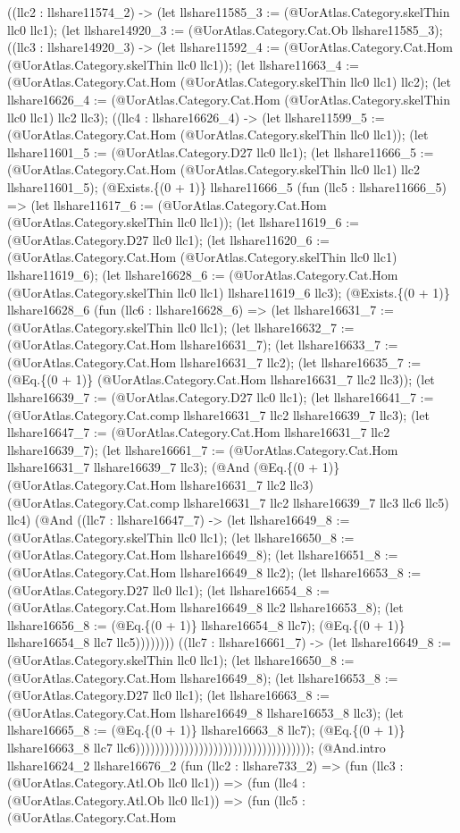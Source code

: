 \documentclass[11pt]{article}
\begin{document}
((llc2 : llshare11574\_2) -> (let llshare11585\_3 := (@UorAtlas.Category.skelThin llc0 llc1); (let llshare14920\_3 := (@UorAtlas.Category.Cat.Ob llshare11585\_3); ((llc3 : llshare14920\_3) -> (let llshare11592\_4 := (@UorAtlas.Category.Cat.Hom (@UorAtlas.Category.skelThin llc0 llc1)); (let llshare11663\_4 := (@UorAtlas.Category.Cat.Hom (@UorAtlas.Category.skelThin llc0 llc1) llc2); (let llshare16626\_4 := (@UorAtlas.Category.Cat.Hom (@UorAtlas.Category.skelThin llc0 llc1) llc2 llc3); ((llc4 : llshare16626\_4) -> (let llshare11599\_5 := (@UorAtlas.Category.Cat.Hom (@UorAtlas.Category.skelThin llc0 llc1)); (let llshare11601\_5 := (@UorAtlas.Category.D27 llc0 llc1); (let llshare11666\_5 := (@UorAtlas.Category.Cat.Hom (@UorAtlas.Category.skelThin llc0 llc1) llc2 llshare11601\_5); (@Exists.\{(0 + 1)\} llshare11666\_5 (fun (llc5 : llshare11666\_5) => (let llshare11617\_6 := (@UorAtlas.Category.Cat.Hom (@UorAtlas.Category.skelThin llc0 llc1)); (let llshare11619\_6 := (@UorAtlas.Category.D27 llc0 llc1); (let llshare11620\_6 := (@UorAtlas.Category.Cat.Hom (@UorAtlas.Category.skelThin llc0 llc1) llshare11619\_6); (let llshare16628\_6 := (@UorAtlas.Category.Cat.Hom (@UorAtlas.Category.skelThin llc0 llc1) llshare11619\_6 llc3); (@Exists.\{(0 + 1)\} llshare16628\_6 (fun (llc6 : llshare16628\_6) => (let llshare16631\_7 := (@UorAtlas.Category.skelThin llc0 llc1); (let llshare16632\_7 := (@UorAtlas.Category.Cat.Hom llshare16631\_7); (let llshare16633\_7 := (@UorAtlas.Category.Cat.Hom llshare16631\_7 llc2); (let llshare16635\_7 := (@Eq.\{(0 + 1)\} (@UorAtlas.Category.Cat.Hom llshare16631\_7 llc2 llc3)); (let llshare16639\_7 := (@UorAtlas.Category.D27 llc0 llc1); (let llshare16641\_7 := (@UorAtlas.Category.Cat.comp llshare16631\_7 llc2 llshare16639\_7 llc3); (let llshare16647\_7 := (@UorAtlas.Category.Cat.Hom llshare16631\_7 llc2 llshare16639\_7); (let llshare16661\_7 := (@UorAtlas.Category.Cat.Hom llshare16631\_7 llshare16639\_7 llc3); (@And (@Eq.\{(0 + 1)\} (@UorAtlas.Category.Cat.Hom llshare16631\_7 llc2 llc3) (@UorAtlas.Category.Cat.comp llshare16631\_7 llc2 llshare16639\_7 llc3 llc6 llc5) llc4) (@And ((llc7 : llshare16647\_7) -> (let llshare16649\_8 := (@UorAtlas.Category.skelThin llc0 llc1); (let llshare16650\_8 := (@UorAtlas.Category.Cat.Hom llshare16649\_8); (let llshare16651\_8 := (@UorAtlas.Category.Cat.Hom llshare16649\_8 llc2); (let llshare16653\_8 := (@UorAtlas.Category.D27 llc0 llc1); (let llshare16654\_8 := (@UorAtlas.Category.Cat.Hom llshare16649\_8 llc2 llshare16653\_8); (let llshare16656\_8 := (@Eq.\{(0 + 1)\} llshare16654\_8 llc7); (@Eq.\{(0 + 1)\} llshare16654\_8 llc7 llc5)))))))) ((llc7 : llshare16661\_7) -> (let llshare16649\_8 := (@UorAtlas.Category.skelThin llc0 llc1); (let llshare16650\_8 := (@UorAtlas.Category.Cat.Hom llshare16649\_8); (let llshare16653\_8 := (@UorAtlas.Category.D27 llc0 llc1); (let llshare16663\_8 := (@UorAtlas.Category.Cat.Hom llshare16649\_8 llshare16653\_8 llc3); (let llshare16665\_8 := (@Eq.\{(0 + 1)\} llshare16663\_8 llc7); (@Eq.\{(0 + 1)\} llshare16663\_8 llc7 llc6)))))))))))))))))))))))))))))))))))); (@And.intro llshare16624\_2 llshare16676\_2 (fun (llc2 : llshare733\_2) => (fun (llc3 : (@UorAtlas.Category.Atl.Ob llc0 llc1)) => (fun (llc4 : (@UorAtlas.Category.Atl.Ob llc0 llc1)) => (fun (llc5 : (@UorAtlas.Category.Cat.Hom 
\end{document}
